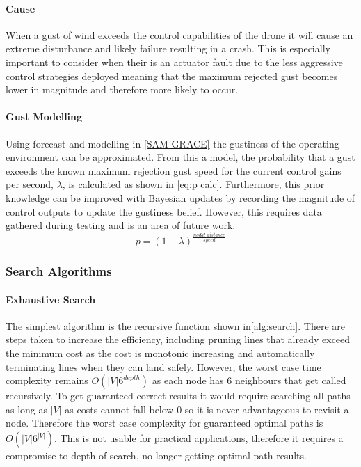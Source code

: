\paragraph{Cause}
When a gust of wind exceeds the control capabilities of the drone it will cause an extreme disturbance and likely failure resulting in a crash. This is especially important to consider when their is an actuator fault due to the less aggressive control strategies deployed meaning that the maximum rejected gust becomes lower in magnitude and therefore more likely to occur. 
\paragraph{Gust Modelling}
Using forecast and modelling in \ref{SAM GRACE} the gustiness of the operating environment can be approximated. From this a model, the probability that a gust exceeds the known maximum rejection gust speed for the current control gains per second, $\lambda$, is calculated as shown in \ref{eq:p calc}. Furthermore, this prior knowledge can be improved with Bayesian updates by recording the magnitude of control outputs to update the gustiness belief. However, this requires data gathered during testing and is an area of future work.
\begin{equation}\label{eq:p calc}
    p = (1-\lambda)^{\frac{nodal\_distance}{speed}}
\end{equation}

\subsubsection{Search Algorithms}


\paragraph{Exhaustive Search}
The simplest algorithm is the recursive function shown in\ref{alg:search}. There are steps taken to increase the efficiency, including pruning lines that already exceed the minimum cost as the cost is monotonic increasing and automatically terminating lines when they can land safely. However, the worst case time complexity remains $O(|V|6^{depth})$ as each node has 6 neighbours that get called recursively. To get guaranteed correct results it would require searching all paths as long as $|V|$ as costs cannot fall below 0 so it is never advantageous to revisit a node. Therefore the worst case complexity for guaranteed optimal paths is $O(|V|6^{|V|})$. This is not usable for practical applications, therefore it requires a compromise to depth of search, no longer getting optimal path results.

